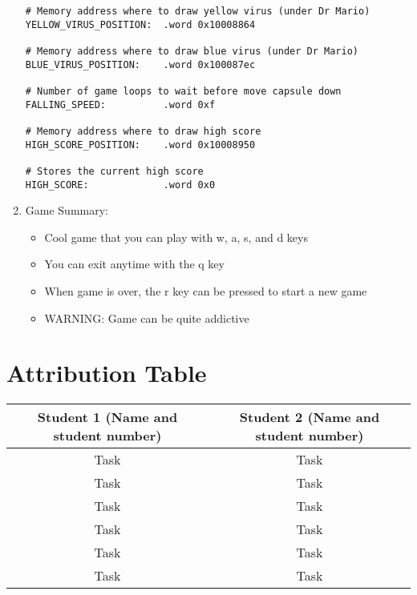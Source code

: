 \documentclass{article}
\begin{document}
\begin{enumerate}
\begin{verbatim}
# Memory address where to draw yellow virus (under Dr Mario)
YELLOW_VIRUS_POSITION:  .word 0x10008864

# Memory address where to draw blue virus (under Dr Mario)
BLUE_VIRUS_POSITION:    .word 0x100087ec

# Number of game loops to wait before move capsule down
FALLING_SPEED:          .word 0xf

# Memory address where to draw high score
HIGH_SCORE_POSITION:    .word 0x10008950

# Stores the current high score
HIGH_SCORE:             .word 0x0
    \end{verbatim}

\item Game Summary:
\begin{itemize}
\item   Cool game that you can play with w, a, s, and d keys
\item   You can exit anytime with the q key
\item   When game is over, the r key can be pressed to start a new game
\item   WARNING: Game can be quite addictive
\end{itemize}

    
\end{enumerate}

\section{Attribution Table}

\begin{center}
\begin{tabular}{|| c | c ||}
\hline
 Student 1 (Name and student number) &  Student 2 (Name and student number) \\ 
 \hline
 Task & Task\\
 \hline
 Task & Task\\
 \hline
 Task & Task\\ 
 \hline
 Task & Task\\ 
 \hline
 Task & Task\\
 \hline
 Task & Task\\  
 \hline
\end{tabular}
\end{center}

\end{document}
